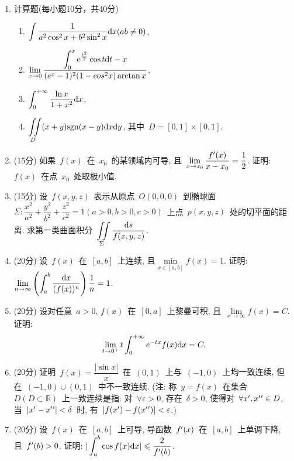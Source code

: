 \documentclass[UTF8,a4paper,11pt]{article}
\begin{document}
\begin{enumerate}
	\item 计算题(每小题10分，共40分)
	      \begin{enumerate}
		      \item $\displaystyle\int\dfrac{1}{a^2\cos^2x+b^2\sin^2x}\mathrm{d}x(ab\neq 0)$,\\
		            \vspace{2em}
		      \item $\displaystyle\lim\limits_{x\to 0}\dfrac{\displaystyle\int_0^x \mathrm{e}^{\frac{t^2}{2}}\cos{t}\mathrm{d}t-x}{(e^x-1)^2(1-cos^2x)\arctan x}$,\\
		            \vspace{2em}
		      \item $\displaystyle\int_0^{+\infty}\dfrac{\ln{x}}{1+x^2}\mathrm{d}x$,\\
		            \vspace{2em}
		      \item $\displaystyle\iint\limits_D(x+y)\mathrm{sgn}(x-y)\mathrm{d}x\mathrm{d}y$, 其中~$D=[0,1]\times[0,1]$.
		            \vspace{2em}
	      \end{enumerate}
	\item (15分) 如果~$f(x)$~在~$x_0$~的某领域内可导, 且~$\lim\limits_{x\to x_0}\dfrac{f\rq{}(x)}{x-x_0}=\dfrac{1}{2}$. 证明: $f(x)$~在点~$x_0$~处取极小值.
	      \vspace{2em}
	\item (15分) 设~$f(x,y,z)$~表示从原点~$O(0,0,0)$~到椭球面~$\Sigma: \dfrac{x^2}{a^2}+\dfrac{y^2}{b^2}+\dfrac{z^2}{c^2}=1(a>0,b>0,c>0)$~上点~$p(x,y,z)$~处的切平面的距离. 求第一类曲面积分~$\displaystyle\iint\limits_{\Sigma}\dfrac{\mathrm{d}s}{f(x,y,z)}$.
	      \vspace{2em}
	\item (20分) 设~$f(x)$~在~$[a,b]$~上连续, 且$\min\limits_{x\in[a,b]}f(x)=1$. 证明: $\displaystyle\lim\limits_{n\to\infty}\left(\int_a^b\dfrac{\mathrm{d}x}{(f(x))^n}\right)\frac{1}{n}=1$.
	      \vspace{2em}
	\item (20分) 设对任意~$a>0$, $f(x)$~在~$[0,a]$~上黎曼可积, 且~$\lim\limits_{x\to\infty}f(x)=C$. 证明:
	      \[\lim_{t\to0^{+}}t\int_0^{+\infty}e^{-tx}f(x)\mathrm{d}x=C.\]
	      \vspace{2em}
	\item (20分) 证明~$f(x)=\dfrac{|\sin{x}|}{x}$~在~$(0,1)$~上与~$(-1,0)$~上均一致连续, 但在~$(-1,0)\cup(0,1)$~中不一致连续. (注: 称~$y=f(x)$~在集合~$D(D\subset\mathbb{R})$~上一致连续是指: 对~$\forall\varepsilon>0$, 存在~$\delta>0$, 使得对~$\forall x\rq{},x\rq{}\rq{}\in D$, 当~$|x\rq{}-x\rq{}\rq{}|<\delta$~时, 有~$|f(x\rq{})-f(x\rq{}\rq{})|<\varepsilon$.)
	      \vspace{2em}
	\item (20分) 设~$f(x)$~在~$[a,b]$~上可导, 导函数~$f\rq{}(x)$~在~$[a,b]$~上单调下降, 且~$f\rq{}(b)>0$. 证明: $\displaystyle|\int_a^b \cos{f(x)}\ud{x}|\leqslant\dfrac{2}{f\rq{}(b)}$.
	      \vspace{2em}
\end{enumerate}
\end{document}
